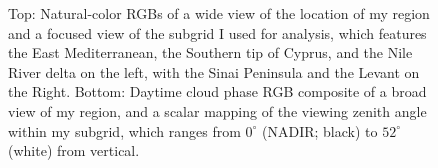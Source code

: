 \documentclass[12pt]{article}
\begin{document}
\begin{figure}[h!]
\begin{center}
    \end{center}
    \caption{Top: Natural-color RGBs of a wide view of the location of my region and a focused view of the subgrid I used for analysis, which features the East Mediterranean, the Southern tip of Cyprus, and the Nile River delta on the left, with the Sinai Peninsula and the Levant on the Right. Bottom: Daytime cloud phase RGB composite of a broad view of my region, and a scalar mapping of the viewing zenith angle within my subgrid, which ranges from $0^\circ$ (NADIR; black) to $52^\circ$ (white) from vertical.}
    \label{domain_rgbs}
\end{figure}
\end{document}

